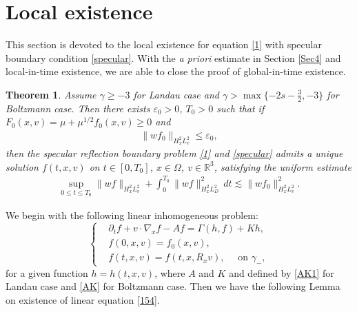 \documentclass[reqno,a4paper]{amsart}
\newtheorem{Thm}{Theorem}[section]
\numberwithin{equation}{section}
\newcommand{\1}{\mathbf{1}}
\newcommand{\R}{\mathbb{R}}
\newcommand{\ve}{\varepsilon}
\newcommand{\vt}{\vartheta}
\newcommand{\<}{\langle}
\renewcommand{\>}{\rangle}
\begin{document}
\section{Local existence}\label{Sec5}

This section is devoted to the local existence for equation \eqref{1} with specular boundary condition \eqref{specular}. With the {\em a priori} estimate in Section \ref{Sec4} and local-in-time existence, we are able to close the proof of global-in-time existence. 
\begin{Thm}\label{localsolution}
	Assume $\gamma\ge -3$ for Landau case and $\gamma>\max\{-2s-\frac{3}{2},-3\}$ for Boltzmann case. 
	Then there exists $\ve_0>0$, $T_0>0$ such that if $F_0(x,v)=\mu+\mu^{1/2}f_0(x,v)\ge 0$ and 
	\begin{align*}
		\|{wf_0}\|_{H^2_xL^2_v}\le\ve_0,
	\end{align*}
	then the specular reflection boundary problem \eqref{1} and \eqref{specular} admits a unique solution $f(t,x,v)$ on $t\in[0,T_0]$, $x\in\Omega$, $v\in\R^3$, satisfying the uniform estimate 
	\begin{align}
		\label{169}
		\sup_{0\le t\le T_0}\|wf\|_{H^2_xL^2_v}+\int^{T_0}_0\|wf\|_{H^2_xL^2_D}^2\,dt\lesssim\|wf_0\|^2_{H^2_xL^2_v}.
	\end{align}
\end{Thm}

We begin with the following linear inhomogeneous problem:
\begin{equation}\label{154}\left\{
	\begin{aligned}
		&\partial_tf + v\cdot \nabla_xf - A f = \Gamma(h,f)+Kh,\\
		&f(0,x,v) = f_0(x,v),\\ 
		&f(t,x,v) = f(t,x,R_xv), \quad \text{ on $\gamma_-$},
	\end{aligned}\right.
\end{equation}
for a given function $h=h(t,x,v)$, where $A$ and $K$ and defined by \eqref{AK1} for Landau case and \eqref{AK} for Boltzmann case. Then we have the following Lemma on existence of linear equation \eqref{154}. 
\end{document}
